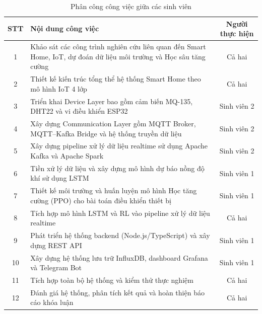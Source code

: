 \begin{table}[H]
\centering
\caption{Phân công công việc giữa các sinh viên}
\begin{tabular}{|c|p{9cm}|c|}
\hline
\textbf{STT} & \textbf{Nội dung công việc} & \textbf{Người thực hiện} \\
\hline
1 & Khảo sát các công trình nghiên cứu liên quan đến Smart Home, IoT, dự đoán dữ liệu môi trường và Học sâu tăng cường & Cả hai \\
\hline
2 & Thiết kế kiến trúc tổng thể hệ thống Smart Home theo mô hình IoT 4 lớp & Cả hai \\
\hline
3 & Triển khai Device Layer bao gồm cảm biến MQ-135, DHT22 và vi điều khiển ESP32 & Sinh viên 2 \\
\hline
4 & Xây dựng Communication Layer gồm MQTT Broker, MQTT--Kafka Bridge và hệ thống truyền dữ liệu & Sinh viên 2 \\
\hline
5 & Xây dựng pipeline xử lý dữ liệu realtime sử dụng Apache Kafka và Apache Spark & Sinh viên 2 \\
\hline
6 & Tiền xử lý dữ liệu và xây dựng mô hình dự báo nồng độ khí sử dụng LSTM & Sinh viên 1 \\
\hline
7 & Thiết kế môi trường và huấn luyện mô hình Học tăng cường (PPO) cho bài toán điều khiển thiết bị & Sinh viên 1 \\
\hline
8 & Tích hợp mô hình LSTM và RL vào pipeline xử lý dữ liệu realtime & Cả hai \\
\hline
9 & Phát triển hệ thống backend (Node.js/TypeScript) và xây dựng REST API & Sinh viên 1 \\
\hline
10 & Xây dựng hệ thống lưu trữ InfluxDB, dashboard Grafana và Telegram Bot & Sinh viên 1 \\
\hline
11 & Tích hợp toàn bộ hệ thống và kiểm thử thực nghiệm & Cả hai \\
\hline
12 & Đánh giá hệ thống, phân tích kết quả và hoàn thiện báo cáo khóa luận & Cả hai \\
\hline
\end{tabular}
\label{tab:task_assignment}
\end{table}
